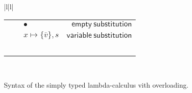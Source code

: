 \documentclass[preprint,authoryear,sort&compress,9pt,nocopyrightspace]{article}
\newcommand{\subx}{x \mapsto \{\overline{v}\},s}
\begin{document}
\begin{figure}
\begin{small}
\begin{center}
\begin{tabular}{|l|l|}
\begin{tabular}{l c l r}
&&$ \bullet$&$\mathsf {empty \ substitution}$\\
&&$\subx$&$\mathsf {variable \ substitution}$\\
&&&\\
&&&\\
&&&\\
&&&\\
&&&\\
\end{tabular}\\
\hline
\end{tabular}
\hspace*{-2cm}
\caption{Syntax of the simply typed lambda-calculus vith overloading.}
\label{figure:sencilla}
\end{center}
\end{small}
\end{figure}
\end{document}
